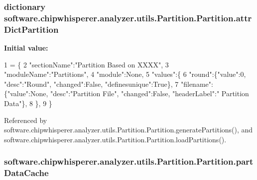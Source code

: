 \subsubsection[{attr\+Dict\+Partition}]{\setlength{\rightskip}{0pt plus 5cm}dictionary software.\+chipwhisperer.\+analyzer.\+utils.\+Partition.\+Partition.\+attr\+Dict\+Partition\hspace{0.3cm}{\ttfamily [static]}}\label{classsoftware_1_1chipwhisperer_1_1analyzer_1_1utils_1_1Partition_1_1Partition_a1f010e20f7d43c561882412dc91567fc}
{\bfseries Initial value\+:}
\begin{DoxyCode}
1 = \{
2                 \textcolor{stringliteral}{"sectionName"}:\textcolor{stringliteral}{"Partition Based on XXXX"},
3                 \textcolor{stringliteral}{"moduleName"}:\textcolor{stringliteral}{"Partitions"},
4                 \textcolor{stringliteral}{"module"}:\textcolor{keywordtype}{None},
5                 \textcolor{stringliteral}{"values"}:\{
6                     \textcolor{stringliteral}{"round"}:\{\textcolor{stringliteral}{"value"}:0, \textcolor{stringliteral}{"desc"}:\textcolor{stringliteral}{"Round"}, \textcolor{stringliteral}{"changed"}:\textcolor{keyword}{False}, \textcolor{stringliteral}{"definesunique"}:\textcolor{keyword}{True}\},
7                     \textcolor{stringliteral}{"filename"}:\{\textcolor{stringliteral}{"value"}:\textcolor{keywordtype}{None}, \textcolor{stringliteral}{"desc"}:\textcolor{stringliteral}{"Partition File"}, \textcolor{stringliteral}{"changed"}:\textcolor{keyword}{False}, \textcolor{stringliteral}{"headerLabel"}:\textcolor{stringliteral}{"
      Partition Data"}\},
8                     \},
9                 \}
\end{DoxyCode}


Referenced by software.\+chipwhisperer.\+analyzer.\+utils.\+Partition.\+Partition.\+generate\+Partitions(), and software.\+chipwhisperer.\+analyzer.\+utils.\+Partition.\+Partition.\+load\+Partitions().

\hypertarget{classsoftware_1_1chipwhisperer_1_1analyzer_1_1utils_1_1Partition_1_1Partition_aef13ee27c73d8d4f03dd66e4bac4a3e3}{}
\subsubsection[{part\+Data\+Cache}]{\setlength{\rightskip}{0pt plus 5cm}software.\+chipwhisperer.\+analyzer.\+utils.\+Partition.\+Partition.\+part\+Data\+Cache}\label{classsoftware_1_1chipwhisperer_1_1analyzer_1_1utils_1_1Partition_1_1Partition_aef13ee27c73d8d4f03dd66e4bac4a3e3}


